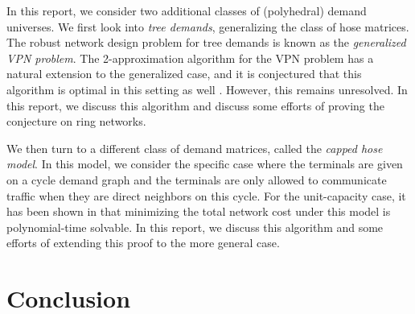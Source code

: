 \documentclass[11pt]{article}
\theoremstyle{definition}
\begin{document}
    In this report, we consider two additional classes of (polyhedral) demand universes.
    We first look into \emph{tree demands}, generalizing the class of hose matrices.
    The robust network design problem for tree demands is known as the \emph{generalized VPN problem}.
    The 2-approximation algorithm for the VPN problem has a natural extension to the generalized case, and it is conjectured that this algorithm is optimal in this setting as well \cite{OLVER2016191}.
    However, this remains unresolved.
    In this report, we discuss this algorithm and discuss some efforts of proving the conjecture on ring networks.

    We then turn to a different class of demand matrices, called the \emph{capped hose model}.
    In this model, we consider the specific case where the terminals are given on a cycle demand graph and the terminals are only allowed to communicate traffic when they are direct neighbors on this cycle.
    For the unit-capacity case, it has been shown in \cite{bosman2017exploring} that minimizing the total network cost under this model is polynomial-time solvable.
    In this report, we discuss this algorithm and some efforts of extending this proof to the more general case.

    

    

    \section{Conclusion}

    
    

    \clearpage
    \appendix
    
\end{document}
